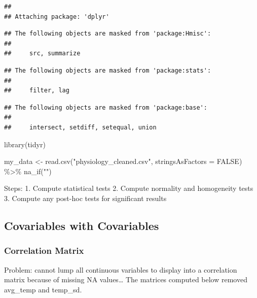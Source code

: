 \documentclass[
]{article}
\newenvironment{Shaded}{\begin{snugshade}}{\end{snugshade}}
\newcommand{\AttributeTok}[1]{\textcolor[rgb]{0.77,0.63,0.00}{#1}}
\newcommand{\ConstantTok}[1]{\textcolor[rgb]{0.00,0.00,0.00}{#1}}
\newcommand{\FunctionTok}[1]{\textcolor[rgb]{0.00,0.00,0.00}{#1}}
\newcommand{\NormalTok}[1]{#1}
\newcommand{\OtherTok}[1]{\textcolor[rgb]{0.56,0.35,0.01}{#1}}
\newcommand{\SpecialCharTok}[1]{\textcolor[rgb]{0.00,0.00,0.00}{#1}}
\newcommand{\StringTok}[1]{\textcolor[rgb]{0.31,0.60,0.02}{#1}}
\begin{document}
\begin{verbatim}
## 
## Attaching package: 'dplyr'
\end{verbatim}

\begin{verbatim}
## The following objects are masked from 'package:Hmisc':
## 
##     src, summarize
\end{verbatim}

\begin{verbatim}
## The following objects are masked from 'package:stats':
## 
##     filter, lag
\end{verbatim}

\begin{verbatim}
## The following objects are masked from 'package:base':
## 
##     intersect, setdiff, setequal, union
\end{verbatim}

\begin{Shaded}
\begin{Highlighting}[]
\FunctionTok{library}\NormalTok{(tidyr)}
\end{Highlighting}
\end{Shaded}

\begin{Shaded}
\begin{Highlighting}[]
\NormalTok{my\_data }\OtherTok{\textless{}{-}} \FunctionTok{read.csv}\NormalTok{(}\StringTok{"physiology\_cleaned.csv"}\NormalTok{, }\AttributeTok{stringsAsFactors =} \ConstantTok{FALSE}\NormalTok{) }\SpecialCharTok{\%\textgreater{}\%} \FunctionTok{na\_if}\NormalTok{(}\StringTok{""}\NormalTok{)}
\end{Highlighting}
\end{Shaded}

Steps: 1. Compute statistical tests 2. Compute normality and homogeneity
tests 3. Compute any post-hoc tests for significant results

\hypertarget{covariables-with-covariables}{%
\subsection{Covariables with
Covariables}\label{covariables-with-covariables}}

\hypertarget{correlation-matrix}{%
\subsubsection{Correlation Matrix}\label{correlation-matrix}}

Problem: cannot lump all continuous variables to display into a
correlation matrix because of missing NA values\ldots{} The matrices
computed below removed avg\_temp and temp\_sd.
\end{document}
